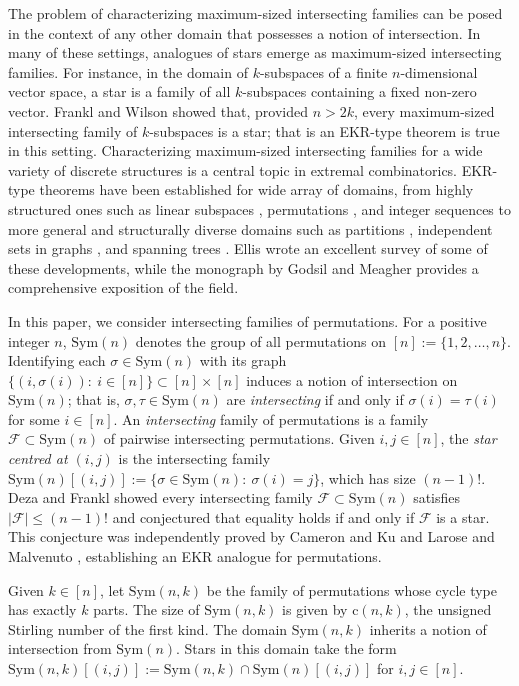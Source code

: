 \documentclass{amsart}
\newcommand{\mcal}{\mathcal}
\newcommand{\sym}{\mathrm{Sym}}
\newcommand{\st}{\mathrm{c}}
\begin{document}
The problem of characterizing maximum-sized intersecting families can be posed in the context of any other domain that possesses a notion of intersection. In many of these settings, analogues of stars emerge as maximum-sized intersecting families. For instance, in the domain of $k$-subspaces of a finite $n$-dimensional vector space, a star is a family of all $k$-subspaces containing a fixed non-zero vector. Frankl and Wilson \cite{FW86} showed that, provided $n>2k$, every maximum-sized intersecting family of $k$-subspaces is a star; that is an EKR-type theorem is true in this setting.  
Characterizing maximum-sized intersecting families for a wide variety of discrete structures is a central topic in extremal combinatorics. EKR-type theorems have been established for wide array of domains, from highly structured ones such as linear subspaces \cite{FW86}, permutations \cite{DezaFrankl77}, and integer sequences \cite{FT} to more general and structurally diverse domains such as partitions \cite{kupavskii2026erd}, independent sets in graphs \cite{HT}, and spanning trees \cite{Trees}. Ellis \cite{Ellissurvey} wrote an excellent survey of some of these developments, while the monograph \cite{EKRbook} by Godsil and Meagher provides a comprehensive exposition of the field.

In this paper, we consider intersecting families of permutations. For a positive integer $n$, $\sym(n)$ denotes the group of all permutations on $[n]:=\{1,2,\ldots,n\}$. Identifying each $\sigma \in \sym(n)$ with its graph $\{(i,\sigma(i))\colon \ i \in [n]\} \subset [n]\times [n]$ induces a notion of intersection on $\sym(n)$; that is, $\sigma,\tau \in \sym(n)$ are {\it intersecting} if and only if $\sigma(i)=\tau(i)$ for some $i\in[n]$. An {\it intersecting} family of permutations is a family $\mcal{F} \subset \sym(n)$ of pairwise intersecting permutations. Given $i,j \in [n]$, the {\it star centred at $(i,j)$} is the intersecting family $\sym(n)[(i,j)]:=\{\sigma\in \sym(n)\colon\ \sigma(i)=j \}$, which has size $(n-1)!$. Deza and Frankl \cite{DezaFrankl77} showed every intersecting family $\mcal{F}\subset \sym(n)$ satisfies $|\mcal{F}| \leq (n-1)!$ and conjectured that equality holds if and only if $\mcal{F}$ is a star. This conjecture was independently proved by Cameron and Ku \cite{CameronKu2003} and Larose and Malvenuto \cite{LaroseMalvenuto2004}, establishing an EKR analogue for permutations.

Given $k\in [n]$, let $\sym(n,k)$ be the family of permutations whose cycle type has exactly $k$ parts. The size of $\sym(n,k)$ is given by $\st(n,k)$, the unsigned Stirling number of the first kind. The domain $\sym(n,k)$ inherits a notion of intersection from $\sym(n)$. Stars in this domain take the form $\sym(n,k)[(i,j)]:=\sym(n,k) \cap \sym(n)[(i,j)]$ for $i,j\in [n]$.
\end{document}
